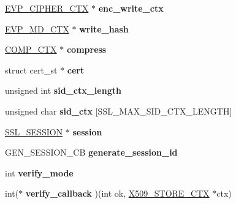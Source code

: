\begin{DoxyCompactItemize}
\mbox{\label{structssl__st_a44444bb7794521afc2b9e52cd0c2570c}} 
\hyperlink{structevp__cipher__ctx__st}{E\+V\+P\+\_\+\+C\+I\+P\+H\+E\+R\+\_\+\+C\+TX} $\ast$ {\bfseries enc\+\_\+write\+\_\+ctx}
\item 
\mbox{\label{structssl__st_a491e1c0b9386b4003bb443af4a2d06d4}} 
\hyperlink{structenv__md__ctx__st}{E\+V\+P\+\_\+\+M\+D\+\_\+\+C\+TX} $\ast$ {\bfseries write\+\_\+hash}
\item 
\mbox{\label{structssl__st_a62a49a9330502d045bbf6376c820225c}} 
\hyperlink{structcomp__ctx__st}{C\+O\+M\+P\+\_\+\+C\+TX} $\ast$ {\bfseries compress}
\item 
\mbox{\label{structssl__st_a335d212e807952601a0eabf4dfd978eb}} 
struct cert\+\_\+st $\ast$ {\bfseries cert}
\item 
\mbox{\label{structssl__st_a7b63f375f11b5232a5dff69e26f6a438}} 
unsigned int {\bfseries sid\+\_\+ctx\+\_\+length}
\item 
\mbox{\label{structssl__st_a486ddbf462473285440234c69568b9ce}} 
unsigned char {\bfseries sid\+\_\+ctx} \mbox{[}S\+S\+L\+\_\+\+M\+A\+X\+\_\+\+S\+I\+D\+\_\+\+C\+T\+X\+\_\+\+L\+E\+N\+G\+TH\mbox{]}
\item 
\mbox{\label{structssl__st_ae6d956c10b03dd3f4d0a3a132466eb47}} 
\hyperlink{structssl__session__st}{S\+S\+L\+\_\+\+S\+E\+S\+S\+I\+ON} $\ast$ {\bfseries session}
\item 
\mbox{\label{structssl__st_aa315242df1667bfb185bfcaa5b7ca86f}} 
G\+E\+N\+\_\+\+S\+E\+S\+S\+I\+O\+N\+\_\+\+CB {\bfseries generate\+\_\+session\+\_\+id}
\item 
\mbox{\label{structssl__st_a7592fd603fe469b789f13bdbc55a172e}} 
int {\bfseries verify\+\_\+mode}
\item 
\mbox{\label{structssl__st_a5891d1f44fd1385ae1c1c4e866450133}} 
int($\ast$ {\bfseries verify\+\_\+callback} )(int ok, \hyperlink{structx509__store__ctx__st}{X509\+\_\+\+S\+T\+O\+R\+E\+\_\+\+C\+TX} $\ast$ctx)
\item 

\end{DoxyCompactItemize}
